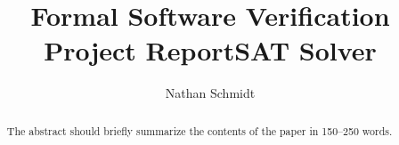 \documentclass[runningheads]{llncs}
\begin{document}
%
\title{Formal Software Verification Project Report\newline{}SAT Solver}
%
%
\author{Nathan Schmidt}
%
%
%
\maketitle              %
%
\begin{abstract}
The abstract should briefly summarize the contents of the paper in
150--250 words.

\end{abstract}
%
%
%





\printbibliography{}
\end{document}
